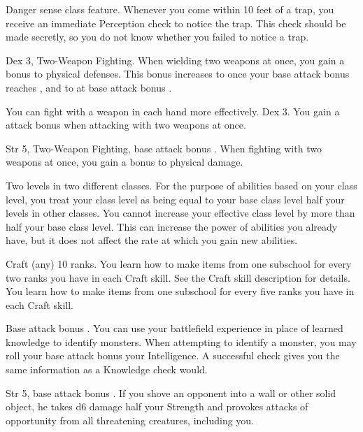 \featpre Danger sense class feature.
\featben Whenever you come within 10 feet of a trap, you receive an immediate Perception check to notice the trap. This check should be made secretly, so you do not know whether you failed to notice a trap.

 Dex 3, Two-Weapon Fighting.
 When wielding two weapons at once, you gain a  bonus to physical defenses. This bonus increases to  once your base attack bonus reaches , and to  at base attack bonus .

You can fight with a weapon in each hand more effectively.
 Dex 3.
 You gain a  attack bonus when attacking with two weapons at once.

 Str 5, Two-Weapon Fighting, base attack bonus .
 When fighting with two weapons at once, you gain a  bonus to physical damage.

\featpre Two levels in two different classes.
\featben For the purpose of abilities based on your class level, you treat your class level as being equal to your base class level \add half your levels in other classes. You cannot increase your effective class level by more than half your base class level. This can increase the power of abilities you already have, but it does not affect the rate at which you gain new abilities.

 Craft (any) 10 ranks.
 You learn how to make items from one subschool for every two ranks you have in each Craft skill. See the Craft skill description for details.
 You learn how to make items from one subschool for every five ranks you have in each Craft skill.

\featpre Base attack bonus .
\featben You can use your battlefield experience in place of learned knowledge to identify monsters. When attempting to identify a monster, you may roll your base attack bonus \add your Intelligence. A successful check gives you the same information as a Knowledge check would.

\featpre Str 5, base attack bonus .
\featben If you shove an opponent into a wall or other solid object, he takes d6 damage \add half your Strength and provokes attacks of opportunity from all threatening creatures, including you.

